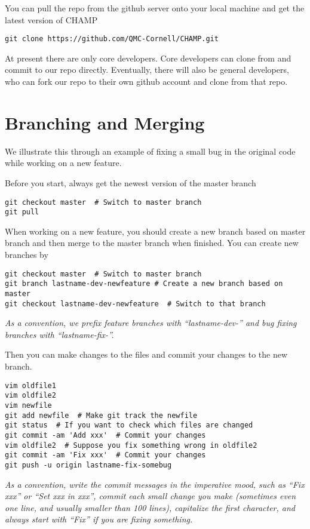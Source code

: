 \documentclass[runningheads,letterpaper]{llncs}
\begin{document}
You can pull the repo from the github server onto your local machine and get the latest version of CHAMP
\begin{verbatim}
git clone https://github.com/QMC-Cornell/CHAMP.git 
\end{verbatim}
At present there are only core developers.
Core developers can clone from and commit to our repo directly.
Eventually, there will also be general developers, who can fork our repo to their own github account and clone from that repo.

\section{Branching and Merging}
\label{sec:basic}
We illustrate this through an example of fixing a small bug in the original code while working on a new feature.

Before you start, always get the newest version of the master branch
\begin{verbatim}
git checkout master  # Switch to master branch
git pull
\end{verbatim}

When working on a new feature, you should create a new branch based on master branch and then merge to the master branch when finished.
You can create new branches by
\begin{verbatim}
git checkout master  # Switch to master branch
git branch lastname-dev-newfeature # Create a new branch based on master
git checkout lastname-dev-newfeature  # Switch to that branch
\end{verbatim}
{\it As a convention, we prefix feature branches with ``lastname-dev-'' and bug fixing branches with ``lastname-fix-''.}

Then you can make changes to the files and commit your changes to the new branch.
\begin{verbatim}
vim oldfile1
vim oldfile2
vim newfile
git add newfile  # Make git track the newfile
git status  # If you want to check which files are changed
git commit -am 'Add xxx'  # Commit your changes
vim oldfile2  # Suppose you fix something wrong in oldfile2
git commit -am 'Fix xxx'  # Commit your changes
git push -u origin lastname-fix-somebug
\end{verbatim}
{\it As a convention,
write the commit messages in the imperative mood, such as ``Fix xxx'' or ``Set xxx in xxx'',
commit each small change you make (sometimes even one line, and usually smaller than 100 lines),
capitalize the first character,
and always start with ``Fix'' if you are fixing something.}
\end{document}
